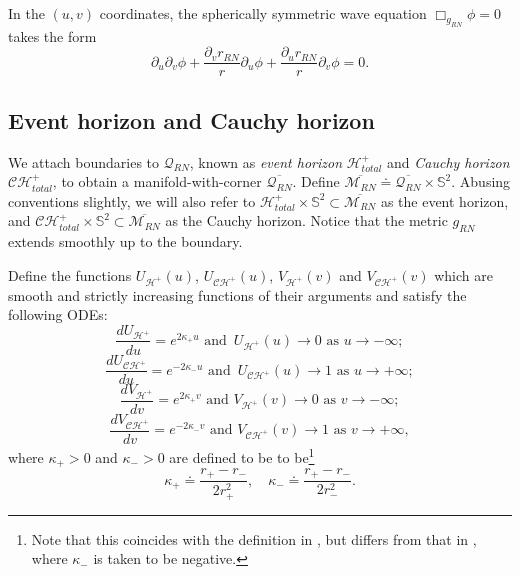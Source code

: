 \documentclass[10pt, reqno]{amsart}
\theoremstyle{definition}
\theoremstyle{remark}
\numberwithin{equation}{section}
\newcommand{\rd}{\partial}
\newcommand{\0}{\emptyset}
\newcommand{\calC}{\mathcal C}
\newcommand{\calH}{\mathcal H}
\newcommand{\f}{\frac}
\newcommand{\CH}{\calC \calH^{+}}		%
\newcommand{\EH}{\calH^{+}}
\begin{document}
In the $(u,v)$ coordinates, the spherically symmetric wave equation $\Box_{g_{RN}} \phi = 0$ takes the form
\begin{equation}\label{eq:ss.wave}
\rd_u \rd_v \phi + \f{\rd_v r_{RN}}r \rd_u \phi + \f{\rd_u r_{RN}}r \rd_v \phi = 0.
\end{equation}

\subsection{Event horizon and Cauchy horizon}\label{sec:horizons} We attach boundaries to $\mathcal Q_{RN}$, known as \emph{event horizon} $\EH_{total}$ and \emph{Cauchy horizon} $\CH_{total}$, to obtain a manifold-with-corner $\overline{\mathcal Q_{RN}}$. Define $\overline{\mathcal M_{RN}} \doteq \overline{\mathcal Q_{RN}}\times \mathbb S^2$. Abusing conventions slightly, we will also refer to $\EH_{total} \times \mathbb S^2 \subset \overline{\mathcal M_{RN}}$ as the event horizon, and $\CH_{total} \times \mathbb S^2 \subset \overline{\mathcal M_{RN}}$ as the Cauchy horizon. Notice that the metric $g_{RN}$ extends smoothly up to the boundary.

Define the functions $U_{\EH}(u)$, $U_{\CH}(u)$, $V_{\EH}(v)$ and $V_{\CH}(v)$ which are smooth and strictly increasing functions of their arguments and satisfy the following ODEs: 
\begin{equation}\label{U.EH.def}
\f{dU_{\EH}}{du}=e^{2\kappa_+ u} \mbox{ and }\, U_{\EH}(u)\to 0 \mbox{ as }u\to -\infty;
\end{equation}
\begin{equation}\label{U.CH.def}
\f{dU_{\CH}}{du}=e^{-2\kappa_- u} \mbox{ and }\, U_{\CH}(u)\to 1 \mbox{ as }u\to +\infty;
\end{equation}
\begin{equation}\label{V.EH.def}
\f{dV_{\EH}}{dv}=e^{2\kappa_+ v}\mbox{ and }V_{\EH}(v)\to 0\mbox{ as }v\to -\infty;
\end{equation}
\begin{equation}\label{V.CH.def}
\f{dV_{\CH}}{dv}=e^{-2\kappa_- v}\mbox{ and }V_{\CH}(v)\to 1\mbox{ as }v\to +\infty,
\end{equation}
where $\kappa_+>0$ and $\kappa_->0$ are defined to be to be\footnote{Note that this coincides with the definition in \cite{LO.interior}, but differs from that in \cite{LO.instab}, where $\kappa_-$ is taken to be negative.} 
\begin{equation}\label{eq:def.kappa}
\kappa_+ \doteq \f{r_+-r_-}{2r_+^2},\quad \kappa_- \doteq \f{r_+-r_-}{2r_-^2}.
\end{equation}
\end{document}
